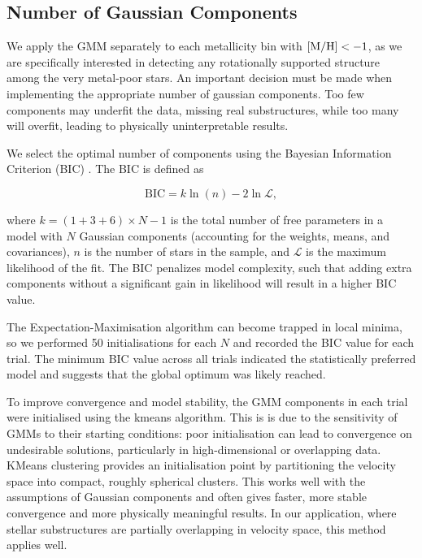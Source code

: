 \documentclass[a4paper,12pt]{article}
\begin{document}
\subsection{Number of Gaussian Components}
\label{subsec:n_components}

We apply the GMM separately to each metallicity bin with ${\rm [M/H]} < -1$, as we are specifically 
interested in detecting any rotationally supported structure among the very metal-poor stars. An important decision 
must be made when implementing the appropriate number of gaussian components. Too few 
components may underfit the data, missing real substructures, while too many will overfit, leading to physically uninterpretable results.

We select the optimal number of components using the Bayesian Information Criterion (BIC) \citealt{Schwarz1978}. 
The BIC is defined as

\begin{equation}
\mathrm{BIC} = k \ln(n) - 2 \ln \mathcal{L},
\end{equation}

where $k = (1 + 3 + 6) \times N - 1$ is the total number of free parameters in a model with $N$ Gaussian components 
(accounting for the weights, means, and covariances), $n$ is the number of stars in the sample, and $\mathcal{L}$ 
is the maximum likelihood of the fit. The BIC penalizes model complexity, such that adding extra components 
without a significant gain in likelihood will result in a higher BIC value.

The Expectation-Maximisation algorithm can become trapped in local minima, so we performed 50 initialisations 
for each $N$ and recorded the BIC value for each trial. The minimum BIC value across all trials indicated 
the statistically preferred model and suggests that the global optimum was likely reached. 

To improve convergence and model stability, the GMM components in each trial were initialised using the kmeans algorithm. 
This is is due to the sensitivity of GMMs to their starting conditions: poor initialisation can lead to convergence 
on undesirable solutions, particularly in high-dimensional or overlapping data. KMeans clustering provides an
initialisation point by partitioning the velocity space into compact, roughly spherical clusters. This works well with the 
assumptions of Gaussian components and often gives faster, more stable convergence and more physically meaningful results. 
In our application, where stellar substructures are partially overlapping in velocity space, this method applies well.
\end{document}
